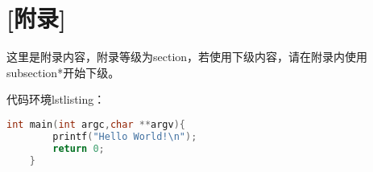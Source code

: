 \newpage
{}
{}
\section*{[附录]}
\vspace*{-2mm}
这里是附录内容，附录等级为section，若使用下级内容，请在附录内使用subsection*开始下级。\par
代码环境lstlisting：
\begin{lstlisting}[language=C]
	int main(int argc,char **argv){
		printf("Hello World!\n");
		return 0;
	}
\end{lstlisting}